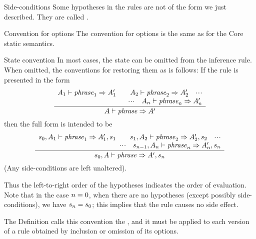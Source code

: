 \begin{definition}{Side-conditions}
Some hypotheses in the rules are not of the form we just described. They
are called .
\end{definition}

\begin{clause}{Convention for options}
The convention for options is the same as for the Core static semantics.
\end{clause}

\begin{convention}{State convention}\label{convention:dynamic-convention:state}
In most cases, the state can be omitted from the inference rule. When
omitted, the conventions for restoring them as is follows:
If the rule is presented in the
form
\begin{equation*}
 \frac{ \begin{array}{r}
        A_{1}\vdash\textit{phrase\/}_{1}\Rightarrow A'_{1}\qquad
        A_{2}\vdash\textit{phrase\/}_{2}\Rightarrow A'_{2}\quad\mbox{$\cdot\!\cdot\!\cdot$}\\
        \mbox{$\cdot\!\cdot\!\cdot$}\quad A_{n}\vdash\textit{phrase\/}_{n}\Rightarrow A'_{n}
        \end{array}
      }
      { A\vdash\textit{phrase\/}\Rightarrow A'}
\end{equation*}
then the full form is intended to be
\begin{equation*}
\frac{ \begin{array}{r}
       s_{0},A_{1}\vdash\textit{phrase\/}_{1}\Rightarrow A'_{1},s_{1}\qquad
       s_{1},A_{2}\vdash\textit{phrase\/}_{2}\Rightarrow A'_{2},s_{2}\quad\mbox{$\cdot\!\cdot\!\cdot$}\\
       \mbox{$\cdot\!\cdot\!\cdot$}\quad s_{n-1},A_{n}\vdash\textit{phrase\/}_{n}\Rightarrow A'_{n},s_{n}
       \end{array}
     }
     { s_{0},A\vdash\textit{phrase\/}\Rightarrow A',s_{n}}
\end{equation*}
(Any side-conditions are left unaltered).

Thus the left-to-right order of the hypotheses indicates the order of
evaluation.  Note that in the case $n=0$, when there are no hypotheses
(except possibly side-conditions), we have $s_{n}=s_{0}$; this implies that the
rule causes no side effect.

The Definition calls this convention the , and
it must be applied to each version of a rule obtained by inclusion or
omission of its options.
\end{convention}

